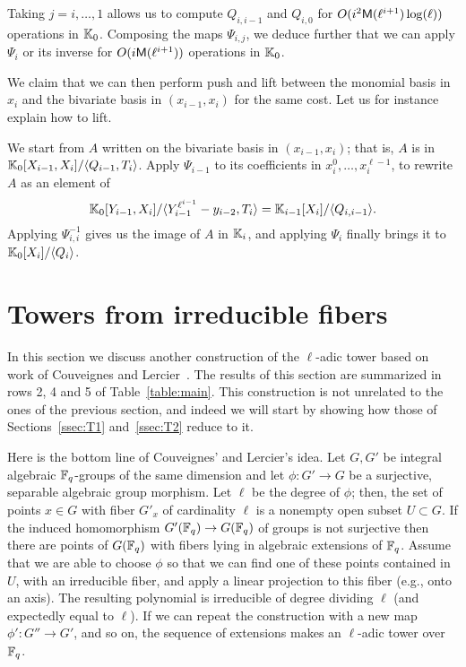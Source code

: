 \documentclass{sig-alternate}
\begin{document}
Taking $j=i,\dots,1$ allows us to compute $Q_{i,i-1}$ and $Q_{i,0}$
for $O(i^2\mathsf{M}(\ell^{i+1})\log(\ell))$ operations in $\mathbb{K}_0$. Composing
the maps $\Psi_{i,j}$, we deduce further that we can apply $\Psi_i$ or
its inverse for $O(i\mathsf{M}(\ell^{i+1}))$ operations in $\mathbb{K}_0$.  

We claim that we can then perform push and lift between the monomial
basis in $x_i$ and the bivariate basis in $(x_{i-1},x_i)$ for the same
cost. Let us for instance explain how to lift.

We start from $A$ written on the bivariate basis in $(x_{i-1},x_i)$;
that is, $A$ is in $\mathbb{K}_0[X_{i-1},X_i]/\langle Q_{i-1},
T_{i}\rangle$. Apply $\Psi_{i-1}$ to its coefficients in
$x_i^0,\dots,x_i^{\ell-1}$, to rewrite $A$ as an element of
$$\mathbb{K}_0[Y_{i-1},X_i]/\langle Y_{i-1}^{\ell^{i-1}}-y_{i-2},
T_{i}\rangle = \mathbb{K}_{i-1}[X_i]/\langle Q_{i,i-1} \rangle.$$ Applying
$\Psi_{i,i}^{-1}$ gives us the image of $A$ in $\mathbb{K}_i$, and applying
$\Psi_i$ finally brings it to $\mathbb{K}_0[X_i]/\langle Q_{i}\rangle$.



\section{Towers from irreducible fibers}
\label{sec:fibers}

In this section we discuss another construction of the $\ell$-adic
tower based on work of Couveignes and
Lercier~\cite{couveignes+lercier11}. The results of this section are
summarized in rows 2, 4 and 5 of Table~\ref{table:main}. This
construction is not unrelated to the ones of the previous section, and
indeed we will start by showing how those of Sections~\ref{ssec:T1}
and~\ref{ssec:T2} reduce to it.

Here is the bottom line of Couveignes' and Lercier's idea. Let $G, G'$
be integral algebraic $\mathbb{F}_q$-groups of the same dimension and let $\phi:
G' \rightarrow G$ be a surjective, separable algebraic group morphism.
Let $\ell$ be the degree of $\phi$; then, the set of points $x \in G$
with fiber $G'_x$ of cardinality $\ell$ is a nonempty open subset $U
\subset G$. If the induced homomorphism $G'(\mathbb{F}_q) \rightarrow G(\mathbb{F}_q)$
of groups is not surjective then there are points of $G(\mathbb{F}_q)$ with
fibers lying in algebraic extensions of $\mathbb{F}_q$. Assume that we are
able to choose $\phi$ so that we can find one of these points contained
in $U$, with an irreducible fiber, and apply a linear projection to
this fiber (e.g., onto an axis). The resulting polynomial is
irreducible of degree dividing $\ell$ (and expectedly equal to
$\ell$). If we can repeat the construction with a new map $\phi':G''\to
G'$, and so on, the sequence of extensions makes an $\ell$-adic tower
over $\mathbb{F}_q$.
\end{document}
